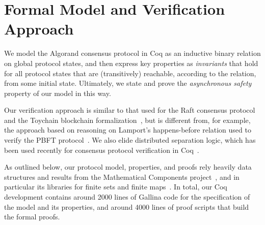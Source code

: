 \section{Formal Model and Verification Approach}
\label{sec:approach}

We model the Algorand consensus protocol in Coq as an inductive binary relation on global protocol states, and then express key properties as \emph{invariants} that hold for all protocol states that are (transitively) reachable, according to the relation, from some initial state. Ultimately, we state and prove the \emph{asynchronous safety} property of our model in this way.

Our verification approach is similar to that used for the Raft consensus protocol~\cite{Woos2016} and the Toychain blockchain formalization~\cite{Pirlea2018}, but is different from, for example, the approach based on reasoning on Lamport's happens-before relation used to verify the PBFT protocol~\cite{Rahli2018}. We also elide distributed separation logic, which has been used recently for consensus protocol verification in Coq~\cite{Sergey2018}.

As outlined below, our protocol model, properties, and proofs rely heavily data structures and results from the Mathematical Components project~\cite{MathComp}, and in particular its libraries for finite sets and finite maps~\cite{Cohen2019}. In total, our Coq development contains around 2000 lines of Gallina code for the specification of the model and its properties, and around 4000 lines of proof scripts that build the formal proofs.

